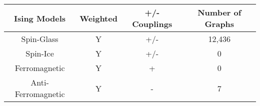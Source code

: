 \documentclass{standalone}
\begin{document}
\begin{tabular}{ |c|c|c|c| } 
    \hline
    Ising Models & Weighted & +/- Couplings & Number of Graphs\\ 
    \hline
    Spin-Glass & Y & +/- & 12,436 \\ 
    Spin-Ice & Y & +/- & 0 \\ 
    Ferromagnetic & Y & + & 0  \\ 
    Anti-Ferromagnetic & Y & - & 7  \\
    \hline
\end{tabular}
\end{document}
